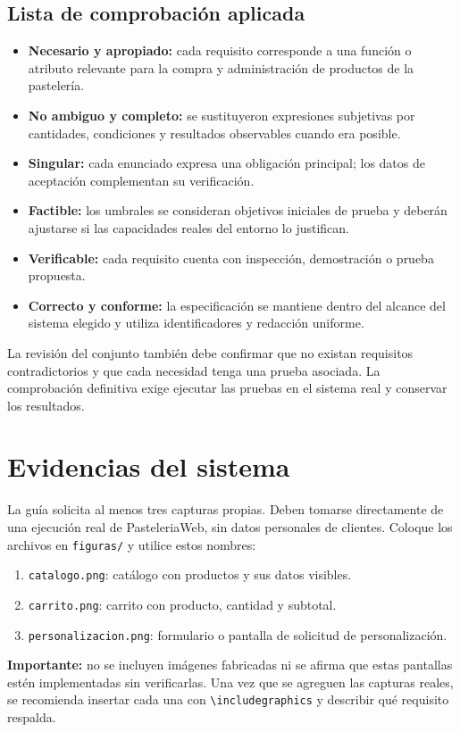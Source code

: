 \documentclass[11pt,a4paper]{article}
\begin{document}
\subsection{Lista de comprobación aplicada}
\begin{itemize}[leftmargin=*]
  \item \textbf{Necesario y apropiado:} cada requisito corresponde a una función o atributo relevante para la compra y administración de productos de la pastelería.
  \item \textbf{No ambiguo y completo:} se sustituyeron expresiones subjetivas por cantidades, condiciones y resultados observables cuando era posible.
  \item \textbf{Singular:} cada enunciado expresa una obligación principal; los datos de aceptación complementan su verificación.
  \item \textbf{Factible:} los umbrales se consideran objetivos iniciales de prueba y deberán ajustarse si las capacidades reales del entorno lo justifican.
  \item \textbf{Verificable:} cada requisito cuenta con inspección, demostración o prueba propuesta.
  \item \textbf{Correcto y conforme:} la especificación se mantiene dentro del alcance del sistema elegido y utiliza identificadores y redacción uniforme.
\end{itemize}

La revisión del conjunto también debe confirmar que no existan requisitos contradictorios y que cada necesidad tenga una prueba asociada. La comprobación definitiva exige ejecutar las pruebas en el sistema real y conservar los resultados.

\section{Evidencias del sistema}
La guía solicita al menos tres capturas propias. Deben tomarse directamente de una ejecución real de PasteleriaWeb, sin datos personales de clientes. Coloque los archivos en \texttt{figuras/} y utilice estos nombres:
\begin{enumerate}[leftmargin=*]
  \item \texttt{catalogo.png}: catálogo con productos y sus datos visibles.
  \item \texttt{carrito.png}: carrito con producto, cantidad y subtotal.
  \item \texttt{personalizacion.png}: formulario o pantalla de solicitud de personalización.
\end{enumerate}
\textbf{Importante:} no se incluyen imágenes fabricadas ni se afirma que estas pantallas estén implementadas sin verificarlas. Una vez que se agreguen las capturas reales, se recomienda insertar cada una con \verb|\includegraphics| y describir qué requisito respalda.
\end{document}
